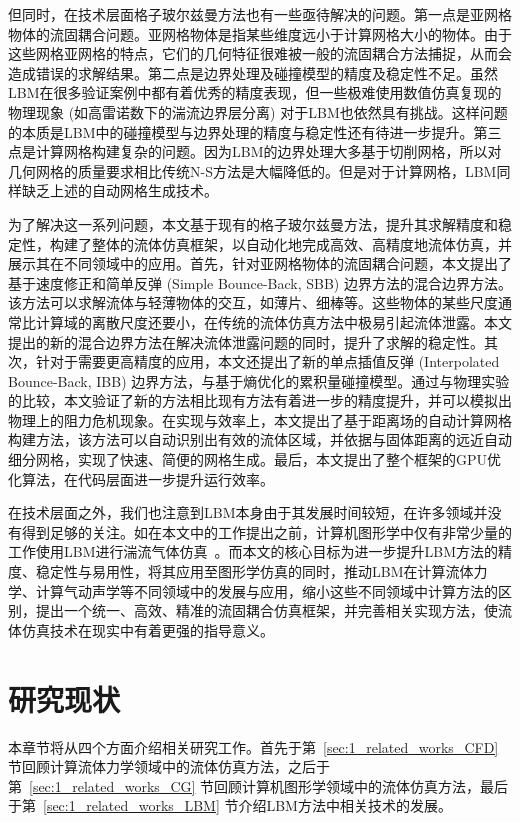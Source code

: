 但同时，在技术层面格子玻尔兹曼方法也有一些亟待解决的问题。第一点是亚网格物体的流固耦合问题。亚网格物体是指某些维度远小于计算网格大小的物体。由于这些网格亚网格的特点，它们的几何特征很难被一般的流固耦合方法捕捉，从而会造成错误的求解结果。第二点是边界处理及碰撞模型的精度及稳定性不足。虽然LBM在很多验证案例中都有着优秀的精度表现，但一些极难使用数值仿真复现的物理现象 (如高雷诺数下的湍流边界层分离) 对于LBM也依然具有挑战。这样问题的本质是LBM中的碰撞模型与边界处理的精度与稳定性还有待进一步提升。第三点是计算网格构建复杂的问题。因为LBM的边界处理大多基于切削网格，所以对几何网格的质量要求相比传统N-S方法是大幅降低的。但是对于计算网格，LBM同样缺乏上述的自动网格生成技术。

为了解决这一系列问题，本文基于现有的格子玻尔兹曼方法，提升其求解精度和稳定性，构建了整体的流体仿真框架，以自动化地完成高效、高精度地流体仿真，并展示其在不同领域中的应用。首先，针对亚网格物体的流固耦合问题，本文提出了基于速度修正和简单反弹 (Simple Bounce-Back, SBB) 边界方法的混合边界方法。该方法可以求解流体与轻薄物体的交互，如薄片、细棒等。这些物体的某些尺度通常比计算域的离散尺度还要小，在传统的流体仿真方法中极易引起流体泄露。本文提出的新的混合边界方法在解决流体泄露问题的同时，提升了求解的稳定性。其次，针对于需要更高精度的应用，本文还提出了新的单点插值反弹 (Interpolated Bounce-Back, IBB) 边界方法，与基于熵优化的累积量碰撞模型。通过与物理实验的比较，本文验证了新的方法相比现有方法有着进一步的精度提升，并可以模拟出物理上的阻力危机现象。在实现与效率上，本文提出了基于距离场的自动计算网格构建方法，该方法可以自动识别出有效的流体区域，并依据与固体距离的远近自动细分网格，实现了快速、简便的网格生成。最后，本文提出了整个框架的GPU优化算法，在代码层面进一步提升运行效率。

在技术层面之外，我们也注意到LBM本身由于其发展时间较短，在许多领域并没有得到足够的关注。如在本文中的工作提出之前，计算机图形学中仅有非常少量的工作使用LBM进行湍流气体仿真~\citep{10.1109/TVCG.2012.303, Li-2019, Li-2020}。而本文的核心目标为进一步提升LBM方法的精度、稳定性与易用性，将其应用至图形学仿真的同时，推动LBM在计算流体力学、计算气动声学等不同领域中的发展与应用，缩小这些不同领域中计算方法的区别，提出一个统一、高效、精准的流固耦合仿真框架，并完善相关实现方法，使流体仿真技术在现实中有着更强的指导意义。


\section{研究现状}
本章节将从四个方面介绍相关研究工作。首先于第~\ref{sec:1_related_works_CFD} 节回顾计算流体力学领域中的流体仿真方法，之后于第~\ref{sec:1_related_works_CG} 节回顾计算机图形学领域中的流体仿真方法，最后于第~\ref{sec:1_related_works_LBM} 节介绍LBM方法中相关技术的发展。

